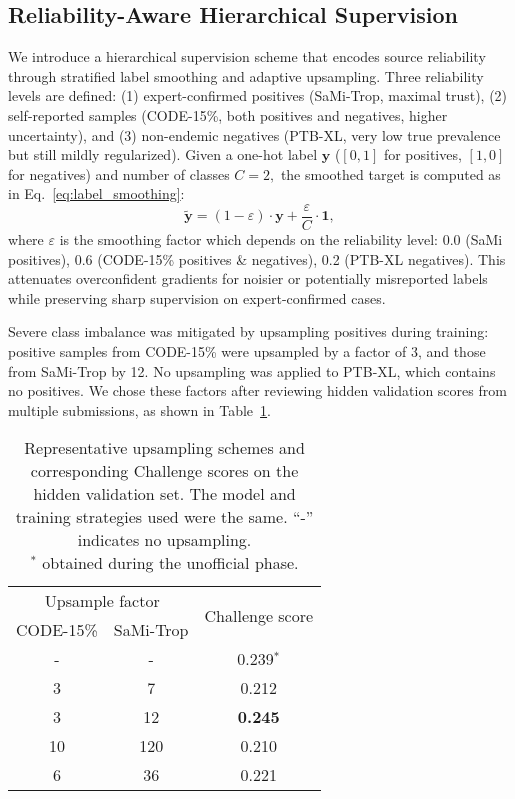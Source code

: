 \subsection{Reliability-Aware Hierarchical Supervision}
\label{subsec:reliability}


We introduce a hierarchical supervision scheme that encodes source reliability through stratified label smoothing and adaptive upsampling. Three reliability levels are defined: (1) expert-confirmed positives (SaMi-Trop, maximal trust), (2) self-reported samples (CODE-15\%, both positives and negatives, higher uncertainty), and (3) non-endemic negatives (PTB-XL, very low true prevalence but still mildly regularized). Given a one-hot label $\mathbf{y}$ ($[0, 1]$ for positives, $[1, 0]$ for negatives) and number of classes $C = 2,$ the smoothed target is computed as in Eq.~\ref{eq:label_smoothing}:
\begin{equation}
\label{eq:label_smoothing}
\tilde{\mathbf{y}} = (1 - \varepsilon) \cdot {\mathbf{y}} + \frac{\varepsilon}{C} \cdot {\mathbf{1}},
\end{equation}
where $\varepsilon$ is the smoothing factor which depends on the reliability level: 0.0 (SaMi positives), 0.6 (CODE-15\% positives \& negatives), 0.2 (PTB-XL negatives). This attenuates overconfident gradients for noisier or potentially misreported labels while preserving sharp supervision on expert-confirmed cases.

Severe class imbalance was mitigated by upsampling positives during training: positive samples from CODE-15\% were upsampled by a factor of 3, and those from SaMi-Trop by 12. No upsampling was applied to PTB-XL, which contains no positives. We chose these factors after reviewing hidden validation scores from multiple submissions, as shown in Table~\ref{tab:upsampling_schemes}.
\begin{table}[!htbp]
\centering
\begin{tabular}{ccc}
\toprule
\multicolumn{2}{c}{Upsample factor} & \multirow{2}{*}{Challenge score} \\
\cmidrule(lr){1-2}
CODE-15\% &  SaMi-Trop & \\
\midrule
- & -     & 0.239$^*$ \\
3 & 7      & 0.212 \\
3 & 12    & \textbf{0.245} \\
10 & 120   & 0.210 \\
6 & 36     & 0.221 \\
\bottomrule
\end{tabular}
\caption{Representative upsampling schemes and corresponding Challenge scores on the hidden validation set. The model and training strategies used were the same. “-” indicates no upsampling.\\
$^*$ obtained during the unofficial phase.
}
\label{tab:upsampling_schemes}
\end{table}


